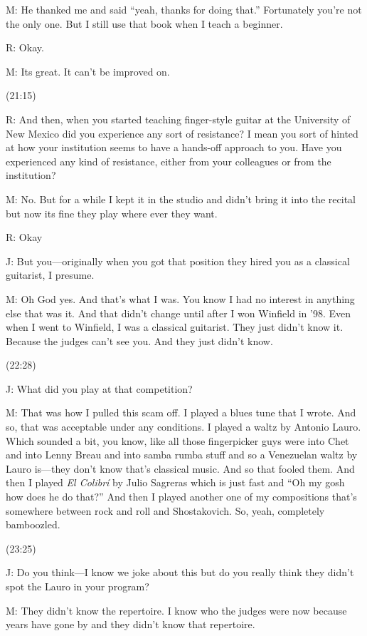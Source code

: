 \documentclass[11pt]{article}
\begin{document}
M: He thanked me and said ``yeah, thanks for doing that.'' Fortunately you're not the only one. But I still use that book when I teach a beginner. 

R: Okay. 

M: Its great. It can't be improved on. 

(21:15)

R: And then, when you started teaching finger-style guitar at the University of New Mexico did you experience any sort of resistance? I mean you sort of hinted at how your institution seems to have a hands-off approach to you. Have you experienced any kind of resistance, either from your colleagues or from the institution? 

M: No. But for a while I kept it in the studio and didn't bring it into the recital but now its fine they play where ever they want. 

R: Okay

J: But you---originally when you got that position they hired you as a classical guitarist, I presume. 

M: Oh God yes. And that's what I was. You know I had no interest in anything else that was it. And that didn't change until after I won Winfield in '98. Even when I went to Winfield, I was a classical guitarist. They just didn't know it. Because the judges can't see you. And they just didn't know. 

(22:28)

J: What did you play at that competition?

M: That was how I pulled this scam off. I played a blues tune that I wrote. And so, that was acceptable under any conditions. I played a waltz by Antonio Lauro. Which sounded a bit, you know, like all those fingerpicker guys were into Chet and into Lenny Breau and into samba rumba stuff and so a Venezuelan waltz by Lauro is---they don't know that's classical music. And so that fooled them. And then I played \emph{El Colibrí} by Julio Sagreras which is just fast and ``Oh my gosh how does he do that?'' And then I played another one of my compositions that's somewhere between rock and roll and Shostakovich. So, yeah, completely bamboozled.

(23:25)

J: Do you think—I know we joke about this but do you really think they didn't spot the Lauro in your program?

M: They didn't know the repertoire. I know who the judges were now because years have gone by and they didn't know that repertoire. 
\end{document}
